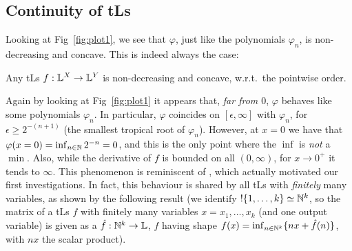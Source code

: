 \subsection{Continuity of tLs}\label{subsec:cont}%

Looking at Fig~\ref{fig:plot1}, we see that $\varphi$, just like the polynomials $\varphi_{n}$, is non-decreasing and concave.
This is indeed always the case:

\begin{proposition}\label{prop:nondecr+conc}
 Any tLs $f:\mathbb{L}^X\to\mathbb{L}^Y$ is non-decreasing and concave, w.r.t.\ the pointwise order.
\end{proposition}

Again by looking at Fig~\ref{fig:plot1} it appears that, \emph{far from $0$}, $\varphi$ behaves like some polynomials $\varphi_{n}$.
In particular, %
$\varphi$ coincides on $[\epsilon,\infty]$ with $\varphi_{n}$,
for $\epsilon \geq 2^{-(n+1)}$ (the smallest tropical root of $\varphi_{n}$).
However, at
%
 $x=0$ we have that $\varphi(x=0)=\inf_{n\in\mathbb{N}} 2^{-n}=0$, and this is the only point where the $\inf$ is \emph{not} a $\min$.
Also, while the derivative of $f$ is bounded on all $(0,\infty)$, for $x\to 0^+$ it tends to $\infty$.
This phenomenon is reminiscent of \cite[Example 7]{Ehrhard2005},
which actually motivated our first investigations.
In fact, this behaviour is shared by all tLs with \emph{finitely} many variables, as shown by the following result (we identify $!\{1,\dots,k\}\simeq \mathbb{N}^k$, so the matrix of a tLs $f$ with finitely many variables $x=x_1,\dots,x_k$ (and one output variable) is given as a $\hat{f}:\mathbb{N}^k\to\mathbb{L}$, $f$ having shape $f(x)=\inf_{n\in \mathbb{N}^k}\{nx+\hat{f}(n)\}$, with $nx$ the scalar product).

